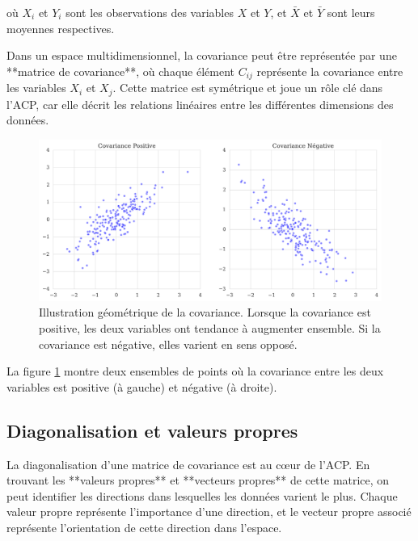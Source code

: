 \documentclass[a4paper,12pt]{report}
\begin{document}
où \( X_i \) et \( Y_i \) sont les observations des variables \( X \) et \( Y \), et \( \bar{X} \) et \( \bar{Y} \) sont leurs moyennes respectives.

Dans un espace multidimensionnel, la covariance peut être représentée par une **matrice de covariance**, où chaque élément \( C_{ij} \) représente la covariance entre les variables \( X_i \) et \( X_j \). Cette matrice est symétrique et joue un rôle clé dans l’ACP, car elle décrit les relations linéaires entre les différentes dimensions des données.

\begin{figure}[H]
    \includegraphics[width=1\textwidth]{covariance_illustration.png} 
    \caption{Illustration géométrique de la covariance. Lorsque la covariance est positive, les deux variables ont tendance à augmenter ensemble. Si la covariance est négative, elles varient en sens opposé.}
    \label{fig:covariance}
\end{figure}

La figure \ref{fig:covariance} montre deux ensembles de points où la covariance entre les deux variables est positive (à gauche) et négative (à droite).

\subsection{Diagonalisation et valeurs propres}

La diagonalisation d'une matrice de covariance est au cœur de l'ACP. En trouvant les **valeurs propres** et **vecteurs propres** de cette matrice, on peut identifier les directions dans lesquelles les données varient le plus. Chaque valeur propre représente l'importance d'une direction, et le vecteur propre associé représente l'orientation de cette direction dans l'espace.
\end{document}
